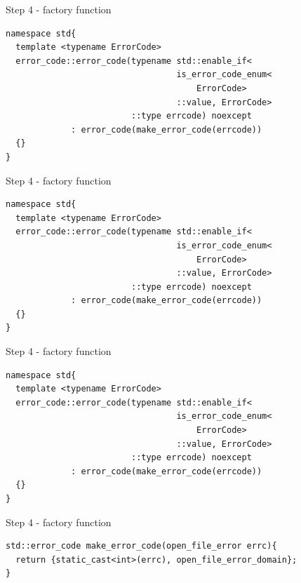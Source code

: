 \documentclass[10pt]{beamer}
\begin{document}
\begin{frame}[fragile]{Step 4 - factory function}

	\begin{verbatim}
namespace std{
  template <typename ErrorCode>
  error_code::error_code(typename std::enable_if<
                                  is_error_code_enum<
                                      ErrorCode>
                                  ::value, ErrorCode>
                         ::type errcode) noexcept 
             : error_code(make_error_code(errcode))
  {}
}
	\end{verbatim}
	
\end{frame}

\begin{frame}[fragile]{Step 4 - factory function}

	\begin{verbatim}
namespace std{
  template <typename ErrorCode>
  error_code::error_code(typename std::enable_if<
                                  is_error_code_enum<
                                      ErrorCode>
                                  ::value, ErrorCode>
                         ::type errcode) noexcept 
             : error_code(make_error_code(errcode))
  {}
}
	\end{verbatim}
	
\end{frame}

\begin{frame}[fragile]{Step 4 - factory function}

	\begin{verbatim}
namespace std{
  template <typename ErrorCode>
  error_code::error_code(typename std::enable_if<
                                  is_error_code_enum<
                                      ErrorCode>
                                  ::value, ErrorCode>
                         ::type errcode) noexcept 
             : error_code(make_error_code(errcode))
  {}
}
	\end{verbatim}
	
\end{frame}

\begin{frame}[fragile]{Step 4 - factory function}
	\begin{verbatim}
std::error_code make_error_code(open_file_error errc){
  return {static_cast<int>(errc), open_file_error_domain};
}
	\end{verbatim}
\end{frame}
\end{document}
